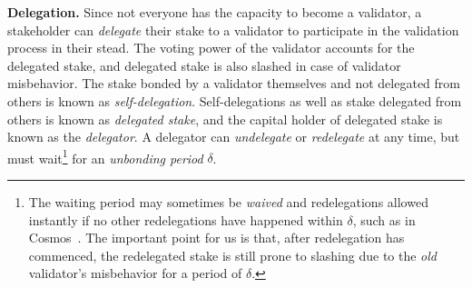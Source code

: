\noindent
\textbf{Delegation.} Since not everyone has the capacity to become a validator,
a stakeholder can \emph{delegate} their stake to a validator to participate in
the validation process in their stead. The voting power of the validator accounts
for the delegated stake, and delegated stake is also slashed in case of validator
misbehavior. The stake bonded by a validator themselves and not delegated from
others is known as \emph{self-delegation}. Self-delegations as
well as stake delegated from others is known as \emph{delegated stake},
and the capital holder of delegated stake is known as the \emph{delegator}.
A delegator can \emph{undelegate} or \emph{redelegate} at any time,
but must wait\footnote{The waiting period may sometimes be \emph{waived} and redelegations
allowed instantly if no other redelegations have happened within $\delta$, such as
in Cosmos~\cite{?}. The important point for us is that, after redelegation has commenced, the
redelegated stake is still prone to slashing due to the \emph{old} validator's misbehavior
for a period of $\delta$.} for an \emph{unbonding period} $\delta$.

